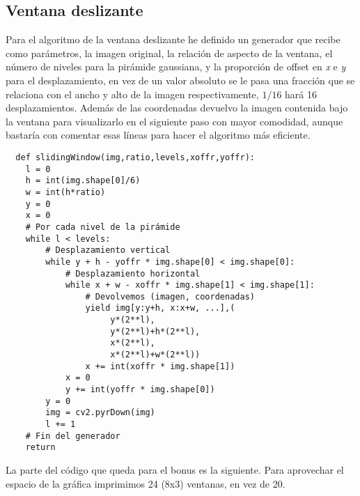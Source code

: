 \documentclass{article}
\begin{document}
\subsection{Ventana deslizante}

Para el algoritmo de la ventana deslizante he definido un generador que recibe como parámetros, la imagen original, la relación de aspecto de la ventana, el número de niveles para la pirámide gaussiana, y la proporción de offset en \textit{x} e \textit{y} para el desplazamiento, en vez de un valor absoluto se le pasa una fracción que se relaciona con el ancho y alto de la imagen respectivamente, $1/16$ hará 16 desplazamientos. Además de las coordenadas devuelvo la imagen contenida bajo la ventana para visualizarlo en el siguiente paso con mayor comodidad, aunque bastaría con comentar esas líneas para hacer el algoritmo más eficiente. 

\begin{verbatim}
  def slidingWindow(img,ratio,levels,xoffr,yoffr):
    l = 0
    h = int(img.shape[0]/6)
    w = int(h*ratio)
    y = 0
    x = 0
    # Por cada nivel de la pirámide
    while l < levels:
        # Desplazamiento vertical
        while y + h - yoffr * img.shape[0] < img.shape[0]:
            # Desplazamiento horizontal
            while x + w - xoffr * img.shape[1] < img.shape[1]:
                # Devolvemos (imagen, coordenadas)
                yield img[y:y+h, x:x+w, ...],(
                     y*(2**l),
                     y*(2**l)+h*(2**l),
                     x*(2**l),
                     x*(2**l)+w*(2**l))
                x += int(xoffr * img.shape[1])
            x = 0
            y += int(yoffr * img.shape[0])
        y = 0
        img = cv2.pyrDown(img)
        l += 1
    # Fin del generador
    return
\end{verbatim}

La parte del código que queda para el bonus es la siguiente. Para aprovechar el espacio de la gráfica imprimimos 24 (8x3) ventanas, en vez de 20.
\end{document}
